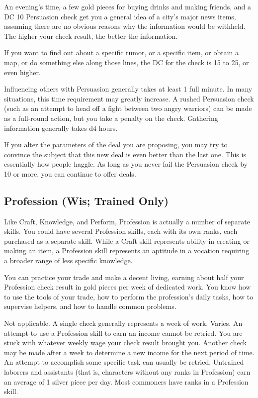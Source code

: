  An evening's time, a few gold pieces for buying drinks and making friends, and a DC 10 Persuasion check get you a general idea of a city's major news items, assuming there are no obvious reasons why the information would be withheld. The higher your check result, the better the information.

If you want to find out about a specific rumor, or a specific item, or obtain a map, or do something else along those lines, the DC for the check is 15 to 25, or even higher.

 Influencing others with Persuasion generally takes at least 1 full minute. In many situations, this time requirement may greatly increase. A rushed Persuasion check (such as an attempt to head off a fight between two angry warriors) can be made as a full-round action, but you take a  penalty on the check. Gathering information generally takes d4 hours.

 If you alter the parameters of the deal you are proposing, you may try to convince the subject that this new deal is even better than the last one. This is essentially how people haggle. As long as you never fail the Persuasion check by 10 or more, you can continue to offer deals.

\subsection{Profession (Wis; Trained Only)}
Like Craft, Knowledge, and Perform, Profession is actually a number of separate skills. You could have several Profession skills, each with its own ranks, each purchased as a separate skill. While a Craft skill represents ability in creating or making an item, a Profession skill represents an aptitude in a vocation requiring a broader range of less specific knowledge.

 You can practice your trade and make a decent living, earning about half your Profession check result in gold pieces per week of dedicated work. You know how to use the tools of your trade, how to perform the profession's daily tasks, how to supervise helpers, and how to handle common problems.

 Not applicable. A single check generally represents a week of work.
 Varies. An attempt to use a Profession skill to earn an income cannot be retried. You are stuck with whatever weekly wage your check result brought you. Another check may be made after a week to determine a new income for the next period of time. An attempt to accomplish some specific task can usually be retried.
 Untrained laborers and assistants (that is, characters without any ranks in Profession) earn an average of 1 silver piece per day. Most commoners have ranks in a Profession skill.

